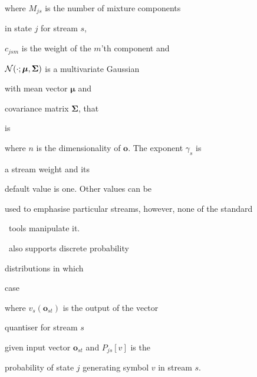 where $M_{js}$ is the number of mixture components 


in state $j$ for stream $s$,


$c_{jsm}$ is the weight of the $m$'th  component and 


${\cal N}(\cdot; {\mbox{\boldmath $\mu$}}, {\mbox{\boldmath $\Sigma$}})$ is a multivariate Gaussian


with mean vector $\bm{\mu}$ and 


covariance matrix $\bm{\Sigma}$, that


is




where $n$ is the dimensionality of $\bm{o}$.  The exponent $\gamma_s$ is


a stream weight and its 


default value is one.  Other values can be


used to emphasise particular streams, however, none of the standard


\HTK\ tools manipulate it.





\HTK\ also supports discrete probability 


distributions in which


case 




where $v_s(\bm{o}_{st})$ is the output of the vector 


quantiser for stream $s$


given input vector $\bm{o}_{st}$ and $P_{js}[v]$ is the 


probability of state $j$ generating symbol $v$ in stream $s$.





